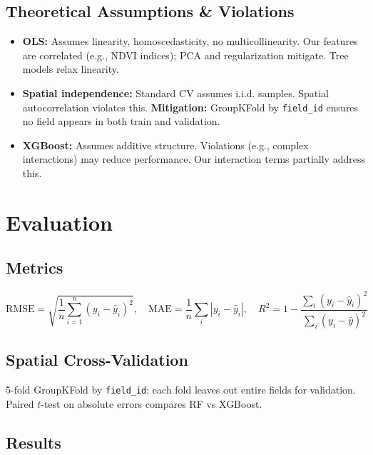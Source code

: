 \documentclass[conference]{IEEEtran}
\begin{document}
\subsection{Theoretical Assumptions \& Violations}

\begin{itemize}
  \item \textbf{OLS:} Assumes linearity, homoscedasticity, no multicollinearity. Our features are correlated (e.g., NDVI indices); PCA and regularization mitigate. Tree models relax linearity.

  \item \textbf{Spatial independence:} Standard CV assumes i.i.d. samples. Spatial autocorrelation violates this. \textbf{Mitigation:} GroupKFold by \texttt{field\_id} ensures no field appears in both train and validation.

  \item \textbf{XGBoost:} Assumes additive structure. Violations (e.g., complex interactions) may reduce performance. Our interaction terms partially address this.
\end{itemize}

\section{Evaluation}
\label{sec:eval}

\subsection{Metrics}

\begin{equation}
  \text{RMSE} = \sqrt{\frac{1}{n}\sum_{i=1}^n (y_i - \hat{y}_i)^2}, \quad
  \text{MAE} = \frac{1}{n}\sum_i |y_i - \hat{y}_i|, \quad
  R^2 = 1 - \frac{\sum_i (y_i - \hat{y}_i)^2}{\sum_i (y_i - \bar{y})^2}
\end{equation}

\subsection{Spatial Cross-Validation}

5-fold GroupKFold by \texttt{field\_id}: each fold leaves out entire fields for validation. Paired $t$-test on absolute errors compares RF vs XGBoost.

\subsection{Results}
\end{document}
